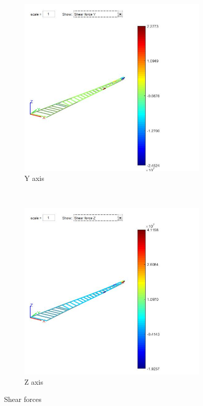 \begin{figure}[h]
	\centering
	\begin{subfigure}{0.45\textwidth}
		\includegraphics[width=\textwidth]{img/ShearForceY.jpg}
		\caption{Y axis}
		\label{fig:shear_y}
	\end{subfigure}
	~ %
	\begin{subfigure}{0.45\textwidth}
		\includegraphics[width=\textwidth]{img/ShearForceZ.jpg}
		\caption{Z axis}
		\label{fig:shear_z}
	\end{subfigure}
	\caption{Shear forces}
	\label{fig:shear}
\end{figure}

